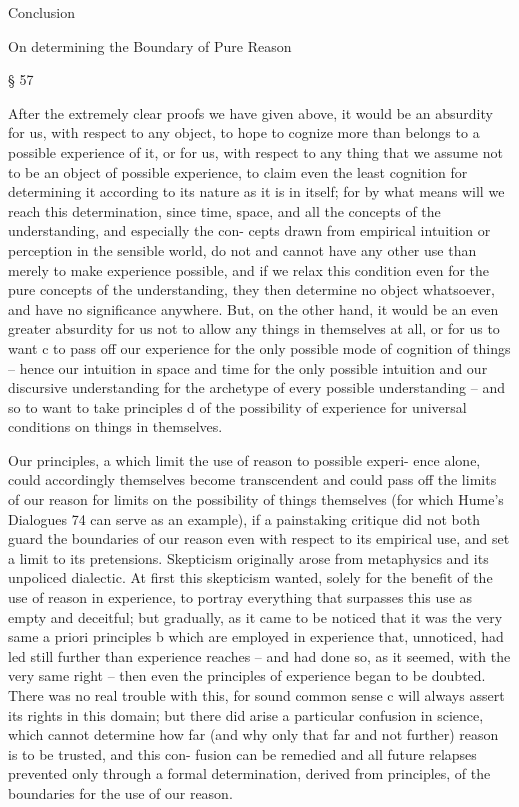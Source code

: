 Conclusion

On determining the Boundary of Pure Reason

§ 57

After the extremely clear proofs we have given above, it would be an
absurdity for us, with respect to any object, to hope to cognize more
than belongs to a possible experience of it, or for us, with respect to any
thing that we assume not to be an object of possible experience, to claim
even the least cognition for determining it according to its nature as it is
in itself; for by what means will we reach this determination, since time,
space, and all the concepts of the understanding, and especially the con-
cepts drawn from empirical intuition or perception in the sensible world,
do not and cannot have any other use than merely to make experience
possible, and if we relax this condition even for the pure concepts of the
understanding, they then determine no object whatsoever, and have no
signiﬁcance anywhere.
But, on the other hand, it would be an even greater absurdity for us
not to allow any things in themselves at all, or for us to want c to pass
off our experience for the only possible mode of cognition of things –
hence our intuition in space and time for the only possible intuition
and our discursive understanding for the archetype of every possible
understanding – and so to want to take principles d of the possibility of
experience for universal conditions on things in themselves.

Our principles, a which limit the use of reason to possible experi-
ence alone, could accordingly themselves become transcendent and could
pass off the limits of our reason for limits on the possibility of things
themselves (for which Hume’s Dialogues 74 can serve as an example), if
a painstaking critique did not both guard the boundaries of our reason
even with respect to its empirical use, and set a limit to its pretensions.
Skepticism originally arose from metaphysics and its unpoliced dialectic.
At ﬁrst this skepticism wanted, solely for the beneﬁt of the use of reason
in experience, to portray everything that surpasses this use as empty and
deceitful; but gradually, as it came to be noticed that it was the very same a
priori principles b which are employed in experience that, unnoticed, had
led still further than experience reaches – and had done so, as it seemed,
with the very same right – then even the principles of experience began
to be doubted. There was no real trouble with this, for sound common
sense c will always assert its rights in this domain; but there did arise a
particular confusion in science, which cannot determine how far (and
why only that far and not further) reason is to be trusted, and this con-
fusion can be remedied and all future relapses prevented only through
a formal determination, derived from principles, of the boundaries for
the use of our reason.

